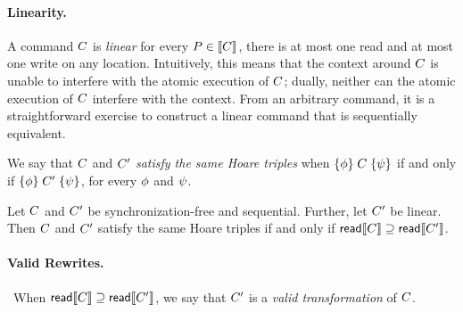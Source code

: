 \paragraph{Linearity.}
A command $C$ is \emph{linear} for every $P\in\llbracket C\rrbracket$, there is
at most one read and at most one write on any location.  Intuitively, this
means that the context around $C$ is unable to interfere with the atomic
execution of $C$; dually, neither can the atomic execution of $C$
interfere with the context.  From an arbitrary command, it is a
straightforward exercise to construct a linear command that is sequentially
equivalent.

We say that $C$ and $C'$ \emph{satisfy the same Hoare triples} when
$\{\phi\}\allowbreak\;C\;\allowbreak\{\psi\}$ if and only if
$\{\phi\}\allowbreak\;C'\;\allowbreak\{\psi\}$, for every $\phi$ and $\psi$.

\begin{corollary}\label{seqcompleteness}
  Let $C$ and $C'$ be synchronization-free and sequential.  Further,
  let $C'$ be linear.
  Then $C$ and $C'$ satisfy the same Hoare
  triples if and only if $\mathsf{read}\llbracket C\rrbracket \supseteq \mathsf{read}\llbracket C'\rrbracket$.
%    
\end{corollary}

\paragraph{Valid Rewrites.}
\ When ${\mathsf{read}}\llbracket C\rrbracket \supseteq {\mathsf{read}}\llbracket C'\rrbracket$, we say that $C'$ is
a \emph{valid transformation} of $C$.

